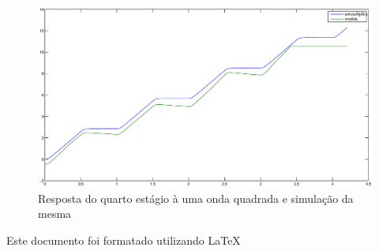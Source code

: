 \documentclass{article}
\begin{document}
\begin{figure}[H]
	\centering
	\includegraphics[width=0.8\linewidth]{sim4}
	\caption{Resposta do quarto estágio à uma onda quadrada e simulação da mesma}
	\label{fig:sim4}
\end{figure}

\begin{thebibliography}{widestlabel}
\end{thebibliography}
\tiny{Este documento foi formatado utilizando \LaTeX}
\end{document}
